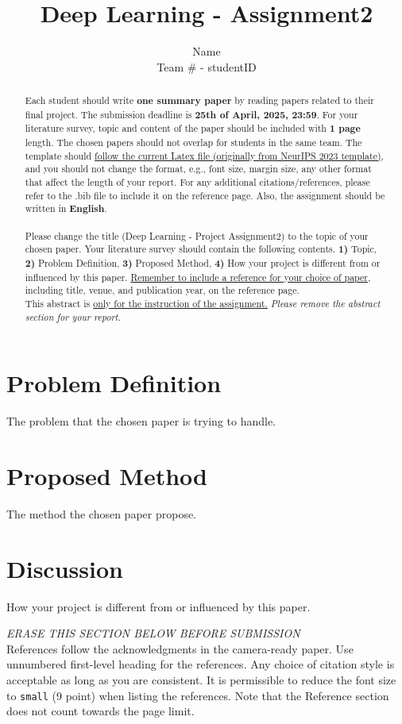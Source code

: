 \documentclass{article}
\title{Deep Learning - Assignment2}
\author{%
Name \\
Team \# - studentID\\
}
\begin{document}
\maketitle


\begin{abstract}
  Each student should write \textbf{one summary paper} by reading papers related to their final project.
  The submission deadline is \textbf{25th of April, 2025, 23:59}.
  For your literature survey, topic and content of the paper should be included with \textbf{1 page} length.
  The chosen papers should not overlap for students in the same team.
  The template should \underline{follow the current Latex file (originally from NeurIPS 2023 template)}, and you should not change the format, e.g., font size, margin size, any other format that affect the length of your report. For any additional citations/references, please refer to the .bib file to include it on the reference page.
  Also, the assignment should be written in \textbf{English}.
  \\\\Please change the title (Deep Learning - Project Assignment2) to the topic of your chosen paper.
  Your literature survey should contain the following contents.
  \textbf{1)} Topic,
  \textbf{2)} Problem Definition,
  \textbf{3)} Proposed Method,
  \textbf{4)} How your project is different from or influenced by this paper. \underline{Remember to include a reference for your choice of paper}, including title, venue, and publication year, on the reference page. \\
  

  This abstract is \underline{only for the instruction of the assignment.}
  \textit{Please remove the abstract section for your report.}
\end{abstract}

\section{Problem Definition}
The problem that the chosen paper\cite{samplepaper} is trying to handle.


\section{Proposed Method}
The method the chosen paper\cite{samplepaper} propose.

\section{Discussion}
How your project is different from or influenced by this paper\cite{samplepaper}.


\newpage
\textit{ERASE THIS SECTION BELOW BEFORE SUBMISSION}\\
References follow the acknowledgments in the camera-ready paper. Use unnumbered first-level heading for
the references. Any choice of citation style is acceptable as long as you are
consistent. It is permissible to reduce the font size to \verb+small+ (9 point)
when listing the references.
Note that the Reference section does not count towards the page limit.



\end{document}
